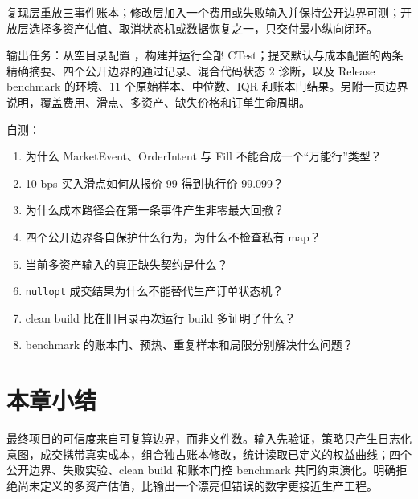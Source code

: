 复现层重放三事件账本；修改层加入一个费用或失败输入并保持公开边界可测；开放层选择多资产估值、取消状态机或数据恢复之一，只交付最小纵向闭环。

输出任务：从空目录配置 ，构建并运行全部 CTest；提交默认与成本配置的两条精确摘要、四个公开边界的通过记录、混合代码状态 2 诊断，以及 Release benchmark 的环境、11 个原始样本、中位数、IQR 和账本门结果。另附一页边界说明，覆盖费用、滑点、多资产、缺失价格和订单生命周期。

自测：
\begin{enumerate}
  \item 为什么 MarketEvent、OrderIntent 与 Fill 不能合成一个“万能行”类型？
  \item 10 bps 买入滑点如何从报价 99 得到执行价 99.099？
  \item 为什么成本路径会在第一条事件产生非零最大回撤？
  \item 四个公开边界各自保护什么行为，为什么不检查私有 map？
  \item 当前多资产输入的真正缺失契约是什么？
  \item \texttt{nullopt} 成交结果为什么不能替代生产订单状态机？
  \item clean build 比在旧目录再次运行 build 多证明了什么？
  \item benchmark 的账本门、预热、重复样本和局限分别解决什么问题？
\end{enumerate}

\section{本章小结}

最终项目的可信度来自可复算边界，而非文件数。输入先验证，策略只产生日志化意图，成交携带真实成本，组合独占账本修改，统计读取已定义的权益曲线；四个公开边界、失败实验、clean build 和账本门控 benchmark 共同约束演化。明确拒绝尚未定义的多资产估值，比输出一个漂亮但错误的数字更接近生产工程。
